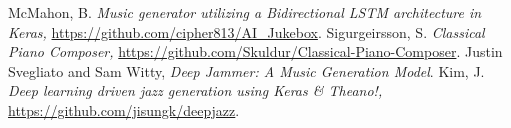 \documentclass[conference]{IEEEtran}
\begin{document}
\begin{thebibliography}{00}
 McMahon, B. \textit{Music generator utilizing a Bidirectional LSTM architecture in Keras,} \url{https://github.com/cipher813/AI_Jukebox}.
 Sigurgeirsson, S. \textit{Classical Piano Composer,} \url{https://github.com/Skuldur/Classical-Piano-Composer}.
 Justin Svegliato and Sam Witty, \textit{Deep Jammer: A Music Generation Model}.
 Kim, J. \textit{Deep learning driven jazz generation using Keras \& Theano!,} \url{https://github.com/jisungk/deepjazz}.
\end{thebibliography}
\vspace{12pt}
\end{document}

